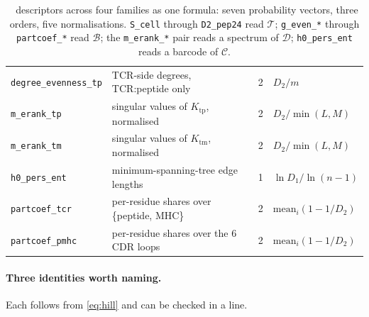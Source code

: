 \documentclass[11pt,a4paper]{article}
\newcommand{\dsc}[1]{\texttt{#1}}
\newcommand{\obj}[1]{\ensuremath{\mathcal{#1}}}
\begin{document}
\begin{table}[t]
\begin{tabular}{@{}llcl@{}}
\dsc{degree\_evenness\_tp} & TCR-side degrees, TCR:peptide only            & 2 & $D_2 / m$ \\
\addlinespace
\dsc{m\_erank\_tp}       & singular values of $K_{\mathrm{tp}}$, normalised & 2 & $D_2 / \min(L,M)$ \\
\dsc{m\_erank\_tm}       & singular values of $K_{\mathrm{tm}}$, normalised & 2 & $D_2 / \min(L,M)$ \\
\dsc{h0\_pers\_ent}      & minimum-spanning-tree edge lengths              & 1 & $\ln D_1 / \ln(n{-}1)$ \\
\addlinespace
\dsc{partcoef\_tcr}      & per-residue shares over \{peptide, MHC\}        & 2 & $\mathrm{mean}_i(1 - 1/D_2)$ \\
\dsc{partcoef\_pmhc}     & per-residue shares over the 6 CDR loops         & 2 & $\mathrm{mean}_i(1 - 1/D_2)$ \\
\bottomrule
\end{tabular}
\caption{\nOpHill\ descriptors across four families as one formula: seven probability vectors,
three orders, five normalisations. \dsc{S\_cell} through \dsc{D2\_pep24} read \obj{T};
\dsc{g\_even\_*} through \dsc{partcoef\_*} read \obj{B}; the \dsc{m\_erank\_*} pair reads a spectrum
of \obj{D}; \dsc{h0\_pers\_ent} reads a barcode of \obj{C}.}
\label{tab:hill}
\end{table}

\paragraph{Three identities worth naming.}
Each follows from \cref{eq:hill} and can be checked in a line.
\end{document}

